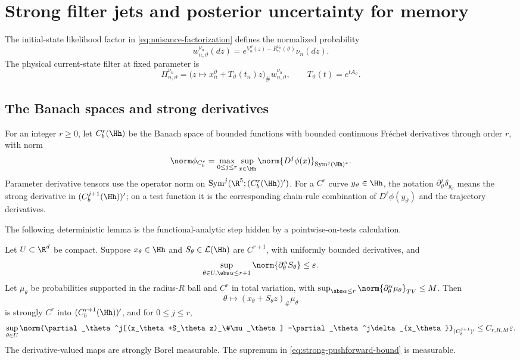 
\section{Strong filter jets and posterior uncertainty for memory}
\label{sec:filter-memory}

The initial-state likelihood factor in \eqref{eq:nuisance-factorization}
defines the normalized probability
\[
 w_{n,\vartheta}^{\nu_n}(dz)
 =e^{V_n^\vartheta(z)-R_n^{\nu_n}(\vartheta)}\nu_n(dz).
\]
The physical current-state filter at fixed parameter is
\begin{equation}
 \Pi_{n,\vartheta}^{\nu_n}
 =\bigl(z\mapsto x_n^\vartheta+T_\vartheta(t_n)z\bigr)_\#
   w_{n,\vartheta}^{\nu_n},
 \qquad T_\vartheta(t)=e^{tA_\vartheta}.
 \label{eq:physical-filter}
\end{equation}

\subsection{The Banach spaces and strong derivatives}

For an integer \(r\ge0\), let \(C_b^r(\Hh)\) be the Banach space of bounded
functions with bounded continuous Fr\'echet derivatives through order \(r\),
with norm
\[
 \norm\phi_{C_b^r}
 =\max_{0\le j\le r}
 \sup_{x\in\Hh}\norm{D^j\phi(x)}_{\operatorname{Sym}^j(\Hh)^*}.
\]
Parameter derivative tensors use the operator norm on
\(\operatorname{Sym}^j(\R^5; (C_b^r(\Hh))')\).  For a \(C^r\) curve
\(y_\vartheta\in\Hh\), the notation
\(\partial_\vartheta^j\delta_{y_\vartheta}\) means the strong derivative in
\((C_b^{j+1}(\Hh))'\); on a test function it is the corresponding chain-rule
combination of \(D^\ell\phi(y_\vartheta)\) and the trajectory derivatives.

The following deterministic lemma is the functional-analytic step hidden by a
pointwise-on-tests calculation.

\begin{lemma}
\label{lem:strong-pushforward}
Let \(U\subset\R^d\) be compact.  Suppose \(x_\theta\in\Hh\) and
\(S_\theta\in\mathcal L(\Hh)\) are \(C^{r+1}\), with uniformly bounded
derivatives, and
\[
 \sup_{\theta\in U,\abs\alpha\le r+1}
 \norm{\partial_\theta^\alpha S_\theta}\le\varepsilon.
\]
Let \(\mu_\theta\) be probabilities supported in the radius-\(R\) ball and
\(C^r\) in total variation, with
\(\sup_{\abs\alpha\le r}\norm{\partial_\theta^\alpha\mu_\theta}_{TV}\le M\).
Then
\[
 \theta\mapsto (x_\theta+S_\theta z)_\#\mu_\theta
\]
is strongly \(C^r\) into \((C_b^{r+1}(\Hh))'\), and for \(0\le j\le r\),
\begin{equation}
 \sup_{\theta\in U}
 \norm{\partial_\theta^j[(x_\theta+S_\theta z)_\#\mu_\theta]
       -\partial_\theta^j\delta_{x_\theta}}_{(C_b^{j+1})'}
 \le C_{r,R,M}\varepsilon.
 \label{eq:strong-pushforward-bound}
\end{equation}
The derivative-valued maps are strongly Borel measurable.  The supremum in
\eqref{eq:strong-pushforward-bound} is measurable.
\end{lemma}

